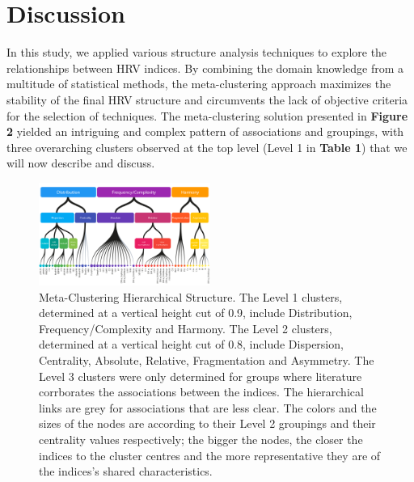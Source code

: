 \documentclass[
  english,
  jou,floatsintext]{apa6}
\begin{document}
\hypertarget{discussion}{%
\section{Discussion}\label{discussion}}

In this study, we applied various structure analysis techniques to explore the relationships between HRV indices. By combining the domain knowledge from a multitude of statistical methods, the meta-clustering approach maximizes the stability of the final HRV structure and circumvents the lack of objective criteria for the selection of techniques. The meta-clustering solution presented in \textbf{Figure 2} yielded an intriguing and complex pattern of associations and groupings, with three overarching clusters observed at the top level (Level 1 in \textbf{Table 1}) that we will now describe and discuss.

\begin{figure}
\includegraphics[width=0.50\textwidth]{figures/figure_dendrogram} \caption{Meta-Clustering Hierarchical Structure. The Level 1 clusters, determined at a vertical height cut of 0.9, include Distribution, Frequency/Complexity and Harmony. The Level 2 clusters, determined at a vertical height cut of 0.8, include Dispersion, Centrality, Absolute, Relative, Fragmentation and Asymmetry. The Level 3 clusters were only determined for groups where literature corrborates the associations between the indices. The hierarchical links are grey for associations that are less clear. The colors and the sizes of the nodes are according to their Level 2 groupings and their centrality values respectively; the bigger the nodes, the closer the indices to the cluster centres and the more representative they are of the indices's shared characteristics.}\label{fig:Figure2}
\end{figure}
\end{document}
